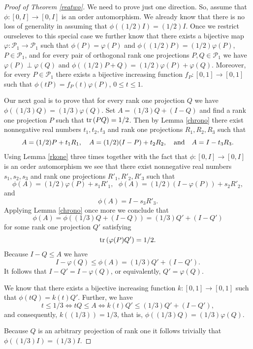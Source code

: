 \documentclass{article}
\begin{document}
\begin{proof}[Proof of Theorem \ref{reatwo}]
We need to prove just one direction. So, assume that $\phi : [0, I] \to [0,I]$ is an order automorphism. We already know that there is no loss of generality in assuming that $\phi ((1/2)I) = (1/2)I$. Once we restrict ourseleves to this special case we further know that there exists a bijective map $\varphi : \mathcal{P}_1 \to \mathcal{P}_1$ such that $\phi (P) = \varphi (P)$ and $\phi ((1/2)P) = (1/2)\varphi (P)$, $P \in \mathcal{P}_1$, and for every pair of orthogonal rank one projections $P,Q \in \mathcal{P}_1$ we have $\varphi (P) \perp
\varphi (Q)$ and $\phi ((1/2)P+Q) = (1/2) \varphi (P) + \varphi (Q)$. Moreover,  for every $P \in \mathcal{P}_1$ there exists a 
bijective increasing function $f_P : [0,1] \to [0,1]$ such that $\phi (tP) = f_P (t) \varphi (P)$, $0 \le t \le 1$.

Our next goal is to prove that for every rank one projection $Q$ we have $\phi ((1/3)Q) = (1/3)\varphi (Q)$. Set $A = (1/3)Q + (I-Q)$ and find a rank one projection $P$ such that ${\rm tr}\, (PQ) = 1/2$. Then by Lemma  \ref{chrono} 
there exist nonnegative real numbers $t_1 , t_2 , t_3$ and rank one projections $R_1 , R_2 , R_3$ such that
$$
A = (1/2)P + t_1 R_1 , \ \ \ A = (1/2)(I-P) + t_2 R_2 , \ \ \ {\rm and} \ \ \ A = I- t_3 R_3.  
$$ 
Using Lemma \ref{rkone} three times together with the fact that $\phi : [0, I] \to [0,I]$ is an order automorphism we see that there exist nonnegative real numbers $s_1 , s_2 , s_3$ and rank one projections $R'_1 , R'_2 , R'_3$ such that
$$
\phi (A) = (1/2)\varphi(P) + s_1 R'_1 , \ \ \ \phi (A) = (1/2)(I-\varphi(P)) + s_2 R'_2 , 
$$
and
$$ 
\phi(A) = I- s_3 R'_3.  
$$ 
Applying Lemma \ref{chrono} once more we conclude that
$$
\phi (A) = \phi (  (1/3)Q + (I-Q) ) =  (1/3)Q' + (I-Q')
$$
for some rank one projection $Q'$ satisfying
$$
{\rm tr}\, (\varphi (P) Q') = 1/2.
$$
Because $I-Q \le A$ we have
$$
I - \varphi(Q) \le \phi (A) =  (1/3)Q' + (I-Q').
$$
It follows that $I-Q' = I - \varphi (Q)$, or equivalently, $Q' = \varphi (Q)$. 

We know that there exists a bijective increasing function $k : [0,1] \to [0,1]$ such that $\phi (tQ) = k(t) Q'$. Further, we have
$$
t \le 1/3 \iff tQ \le A \iff k(t) Q' \le (1/3)Q' + (I-Q'),
$$
and consequently, $k((1/3)) = 1/3$, that is, $\phi ((1/3)Q) = (1/3)\varphi (Q)$. 

Because $Q$ is an arbitrary projection of rank one it follows trivially that $\phi ((1/3)I) = (1/3)I$.


\end{proof}
\end{document}
